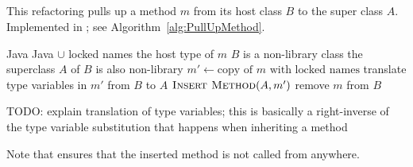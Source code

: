 \subsection{}
This refactoring pulls up a method $m$ from its host class $B$ to the super class $A$. Implemented in ; see Algorithm~\ref{alg:PullUpMethod}.

\begin{algorithm}[p]
\caption{$\refactoring{Pull Up Method}(m : \type{Method})$}\label{alg:PullUpMethod}
\begin{algorithmic}[1]
\REQUIRE Java
\ENSURE Java $\cup$ locked names
\medskip
\STATE \assert the host type of $m$ $B$ is a non-library class
\STATE \assert the superclass $A$ of $B$ is also non-library
\STATE $m' \leftarrow \text{copy of $m$ with locked names}$
\STATE translate type variables in $m'$ from $B$ to $A$
\STATE $\textsc{Insert Method}(A, m')$
\STATE remove $m$ from $B$
\end{algorithmic}
\end{algorithm}

TODO: explain translation of type variables; this is basically a right-inverse of the type variable substitution that happens when inheriting a method

Note that  ensures that the inserted method is not called from anywhere.
